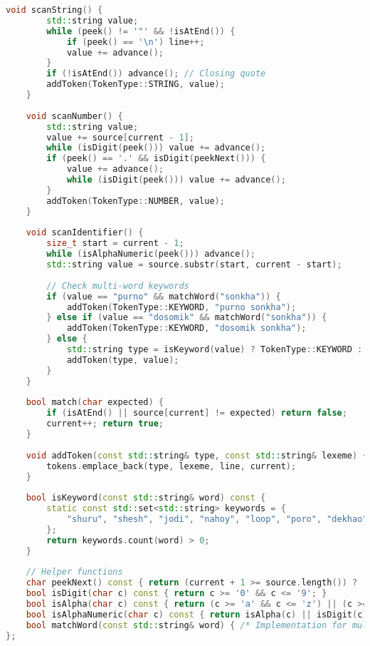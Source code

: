 \documentclass[12pt,a4paper]{article}
\begin{document}
\begin{lstlisting}[language=C++, caption=Lexical Analyzer Implementation (Key Components)]
    void scanString() {
        std::string value;
        while (peek() != '"' && !isAtEnd()) {
            if (peek() == '\n') line++;
            value += advance();
        }
        if (!isAtEnd()) advance(); // Closing quote
        addToken(TokenType::STRING, value);
    }
    
    void scanNumber() {
        std::string value;
        value += source[current - 1];
        while (isDigit(peek())) value += advance();
        if (peek() == '.' && isDigit(peekNext())) {
            value += advance();
            while (isDigit(peek())) value += advance();
        }
        addToken(TokenType::NUMBER, value);
    }
    
    void scanIdentifier() {
        size_t start = current - 1;
        while (isAlphaNumeric(peek())) advance();
        std::string value = source.substr(start, current - start);
        
        // Check multi-word keywords
        if (value == "purno" && matchWord("sonkha")) {
            addToken(TokenType::KEYWORD, "purno sonkha");
        } else if (value == "dosomik" && matchWord("sonkha")) {
            addToken(TokenType::KEYWORD, "dosomik sonkha");
        } else {
            std::string type = isKeyword(value) ? TokenType::KEYWORD : TokenType::IDENTIFIER;
            addToken(type, value);
        }
    }
    
    bool match(char expected) {
        if (isAtEnd() || source[current] != expected) return false;
        current++; return true;
    }
    
    void addToken(const std::string& type, const std::string& lexeme) {
        tokens.emplace_back(type, lexeme, line, current);
    }
    
    bool isKeyword(const std::string& word) const {
        static const std::set<std::string> keywords = {
            "shuru", "shesh", "jodi", "nahoy", "loop", "poro", "dekhao"
        };
        return keywords.count(word) > 0;
    }
    
    // Helper functions
    char peekNext() const { return (current + 1 >= source.length()) ? '\0' : source[current + 1]; }
    bool isDigit(char c) const { return c >= '0' && c <= '9'; }
    bool isAlpha(char c) const { return (c >= 'a' && c <= 'z') || (c >= 'A' && c <= 'Z') || c == '_'; }
    bool isAlphaNumeric(char c) const { return isAlpha(c) || isDigit(c); }
    bool matchWord(const std::string& word) { /* Implementation for multi-word matching */ return true; }
};
\end{lstlisting}
\end{document}
